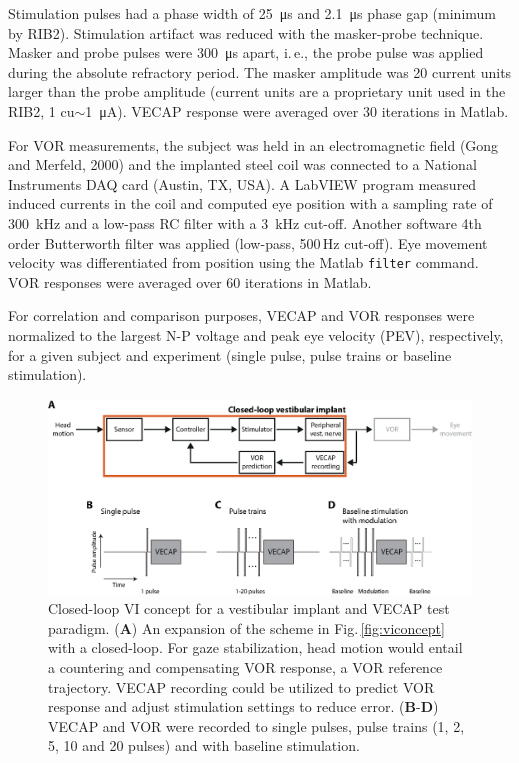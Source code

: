 Stimulation pulses had a phase width of \SI{25}{\micro\second} and \SI{2.1}{\micro\second} phase gap (minimum by RIB2). Stimulation artifact was reduced with the masker-probe technique. Masker and probe pulses were \SI{300}{\micro\second} apart, i.\,e., the probe pulse was applied during the absolute refractory period. The masker amplitude was 20 current units larger than the probe amplitude (current units are a proprietary unit used in the RIB2, 1 cu$\sim$\SI{1}{\micro\ampere}). VECAP response were averaged over 30 iterations in Matlab.

For VOR measurements, the subject was held in an electromagnetic field (Gong and Merfeld, 2000) and the implanted steel coil was connected to a National Instruments DAQ card (Austin, TX, USA). A LabVIEW program measured induced currents in the coil and computed eye position with a sampling rate of \SI{300}{\kilo\hertz} and a low-pass RC filter with a \SI{3}{\kilo\hertz} cut-off. Another software 4th order Butterworth filter was applied (low-pass, 500\,Hz cut-off). Eye movement velocity was differentiated from position using the Matlab \texttt{filter} command. VOR responses were averaged over 60 iterations in Matlab. 

For correlation and comparison purposes, VECAP and VOR responses were normalized to the largest N-P voltage and peak eye velocity (PEV), respectively, for a given subject and experiment (single pulse, pulse trains or baseline stimulation).
\begin{figure}[btp]
\centering
\includegraphics[width=\textwidth]{chapters/partI/vecapvor/figures/Fig_vecapvor_closedloop.eps} 
\caption[Closed-loop VI concept for a vestibular implant and VECAP test paradigm]{Closed-loop VI concept for a vestibular implant and VECAP test paradigm. (\textbf{A}) An expansion of the scheme in Fig.\,\ref{fig:viconcept} with a closed-loop. For gaze stabilization, head motion would entail a countering and compensating VOR response, a VOR reference trajectory. VECAP recording could be utilized to predict VOR response and adjust stimulation settings to reduce error. (\textbf{B}-\textbf{D}) VECAP and VOR were recorded to single pulses, pulse trains (1, 2, 5, 10 and 20 pulses) and with baseline stimulation.}
\label{fig:vecapvor:closedloop}
\end{figure}


